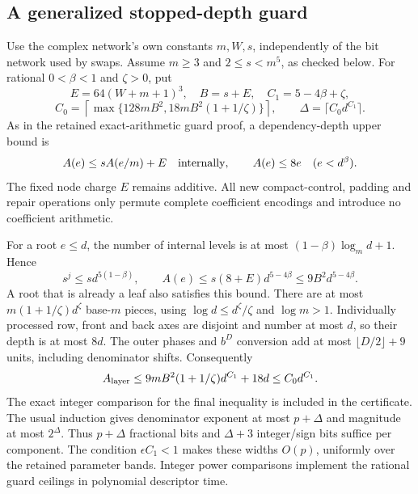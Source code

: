 \subsection{A generalized stopped-depth guard}
\label{sec:compact-stopped-guard}
Use the complex network's own constants $m,W,s$, independently of the bit
network used by swaps. Assume $m\ge3$ and $2\le s<m^5$, as checked below.
For rational $0<\beta<1$ and $\zeta>0$, put
\[
 E=64(W+m+1)^3,\quad B=s+E,\quad C_1=5-4\beta+\zeta,
\]
\[
 C_0=\left\lceil\max\{128mB^2,18mB^2(1+1/\zeta)\}\right\rceil,
 \qquad \Delta=\lceil C_0d^{C_1}\rceil.
\]
As in the retained exact-arithmetic guard proof, a dependency-depth upper
bound is
\[
 A(e)\le sA(e/m)+E\quad\hbox{internally},\qquad A(e)\le8e
 \quad(e<d^\beta).
\]
The fixed node charge $E$ remains additive. All new compact-control,
padding and repair operations only permute complete coefficient encodings
and introduce no coefficient arithmetic.

For a root $e\le d$, the number of internal levels is at most
$(1-\beta)\log_m d+1$. Hence
\[
 s^j\le s d^{5(1-\beta)},\qquad
 A(e)\le s(8+E)d^{5-4\beta}\le9B^2d^{5-4\beta}.
\]
A root that is already a leaf also satisfies this bound. There are at most
$m(1+1/\zeta)d^\zeta$ base-$m$ pieces, using
$\log d\le d^\zeta/\zeta$ and $\log m>1$. Individually processed
row, front and back axes are disjoint and number at most $d$, so their
depth is at most $8d$. The outer phases and $b^D$ conversion add at most
$\lfloor D/2\rfloor+9$ units, including denominator shifts. Consequently
\[
 A_{\rm layer}\le9mB^2(1+1/\zeta)d^{C_1}+18d
              \le C_0d^{C_1}.
\]
The exact integer comparison for the final inequality is included in the
certificate. The usual induction gives denominator exponent at most
$p+\Delta$ and magnitude at most $2^\Delta$. Thus $p+\Delta$ fractional
bits and $\Delta+3$ integer/sign bits suffice per component. The condition
$\epsilon C_1<1$ makes these widths $O(p)$, uniformly over the retained
parameter bands. Integer power comparisons implement the rational guard
ceilings in polynomial descriptor time.
